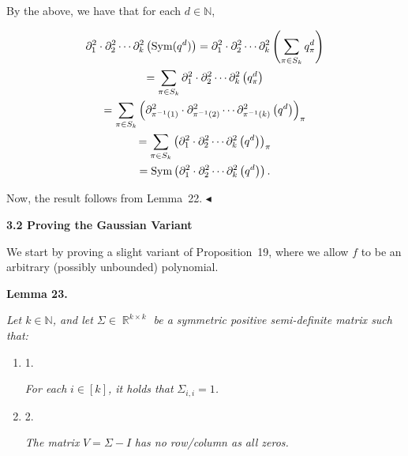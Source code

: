 By the above, we have that for each $d\in\mathbb{N}$,\par


\[\begin{gathered}
\displaystyle\partial_{1}^{2}\cdot\partial_{2}^{2}\cdots\partial_{k}^{2}\left(\textnormal{Sym}(q^{d})\right) \displaystyle=\partial_{1}^{2}\cdot\partial_{2}^{2}\cdots\partial_{k}^{2}\left(\sum_{\pi\in S_{k}}q_{\pi}^{d}\right) \\
\displaystyle=\sum_{\pi\in S_{k}}\partial_{1}^{2}\cdot\partial_{2}^{2}\cdots\partial_{k}^{2}\left(q_{\pi}^{d}\right) \\
\displaystyle=\sum_{\pi\in S_{k}}\left(\partial_{\pi^{-1}(1)}^{2}\cdot\partial_{\pi^{-1}(2)}^{2}\cdots\partial_{\pi^{-1}(k)}^{2}\left(q^{d}\right)\right)_{\pi} \\
\displaystyle=\sum_{\pi\in S_{k}}\left(\partial_{1}^{2}\cdot\partial_{2}^{2}\cdots\partial_{k}^{2}\left(q^{d}\right)\right)_{\pi} \\
\displaystyle=\textnormal{Sym}\left(\partial_{1}^{2}\cdot\partial_{2}^{2}\cdots\partial_{k}^{2}\left(q^{d}\right)\right).
\end{gathered}\]


Now, the result follows from Lemma 22.
$\blacktriangleleft$\par






\par\medskip\noindent\textbf{
3.2 Proving the Gaussian Variant}\par




We start by proving a slight variant of Proposition 19, where we allow $f$ to be an arbitrary (possibly unbounded) polynomial.\par





\par\medskip\noindent\textbf{
\textbf{Lemma 23}\textbf{.}
}\par



\emph{Let $k\in\mathbb{N}$, and let $\Sigma\in\mathop{\mathbb{R}}^{k\times k}$ be a symmetric positive semi-definite matrix such that:}\par


\begin{enumerate}


\item[] 
1. 


\emph{For each }$i\in[k]$\emph{, it holds that }$\Sigma_{i,i}=1$\emph{.}\par





\item[] 
2. 


\emph{The matrix }$V=\Sigma-I$\emph{ has no row/column as all zeros.}\par





\end{enumerate}



